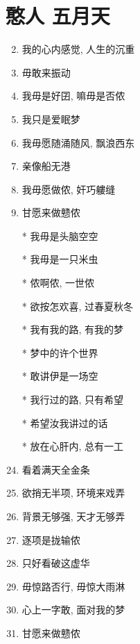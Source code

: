 \documentclass[UTF8]{ctexart}
\begin{document}
    \section*{憨人 \by 五月天}

    \begin{center}
        \begin{enumerate}

            \item[] 
            \item 我的心内感觉, 人生的沉重
            \item 毋敢来振动
            \item 我毋是好囝, 嘛毋是否侬
            \item 我只是爱眠梦
            \item 我毋愿随涌随风, 飘浪西东
            \item 亲像船无港
            \item 我毋愿做侬, 奸巧軁缝
            \item 甘愿来做戆侬

            \item[]
            \item[] \chorus
            \item[*] 我毋是头脑空空
            \item[*] 我毋是一只米虫
            \item[*] 侬啊侬, 一世侬
            \item[*] 欲按怎欢喜, 过春夏秋冬
            \item[*] 我有我的路, 有我的梦
            \item[*] 梦中的许个世界
            \item[*] 敢讲伊是一场空
            \item[*] 我行过的路, 只有希望
            \item[*] 希望汝我讲过的话
            \item[*] 放在心肝内, 总有一工

            \item[]
            \item[] 
            \item 看着满天全金条
            \item 欲捎无半项, 环境来戏弄
            \item 背景无够强, 天才无够弄
            \item 逐项是拢输侬
            \item 只好看破这虚华
            \item 毋惊路否行, 毋惊大雨淋
            \item 心上一字敢, 面对我的梦
            \item 甘愿来做戆侬
            

\end{enumerate}
\end{center}
\end{document}
